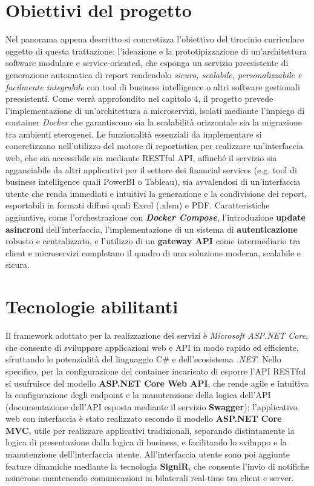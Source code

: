 \section{Obiettivi del progetto}
Nel panorama appena descritto si concretizza l'obiettivo del tirocinio curriculare oggetto di questa trattazione: l’ideazione e la prototipizzazione di un'architettura software modulare e service-oriented, che esponga un servizio preesistente di generazione automatica di report rendendolo \emph{sicuro, scalabile, personalizzabile e facilmente integrabile} con tool di business intelligence o altri software gestionali preesistenti.
Come verrà approfondito nel capitolo 4, il progetto prevede l'implementazione di un'architettura a microservizi, isolati mediante l'impiego di container \emph{Docker} che garantiscono sia la scalabilità orizzontale sia la migrazione tra ambienti eterogenei.
Le funzionalità essenziali da implementare si concretizzano nell'utilizzo del motore di reportistica per realizzare un'interfaccia web, che sia accessibile sia mediante RESTful API, affinché il servizio sia agganciabile da altri applicativi per il settore dei financial services (e.g. tool di business intelligence quali PowerBI o Tableau), sia avvalendosi di un'interfaccia utente che renda immediati e intuitivi la generazione e la condivisione dei report, esportabili in formati diffusi quali Excel (.xlsm) e PDF.
Caratteristiche aggiuntive, come l'orchestrazione con \emph{\textbf{Docker Compose}}, l'introduzione \textbf{update asincroni} dell'interfaccia, l'implementazione di un sistema di \textbf{autenticazione} robusto e centralizzato, e l'utilizzo di un \textbf{gateway API} come intermediario tra client e microservizi completano il quadro di una soluzione moderna, scalabile e sicura.

\section{Tecnologie abilitanti}
Il framework adottato per la realizzazione dei servizi è \emph{Microsoft ASP.NET Core}, che consente di sviluppare applicazioni web e API in modo rapido ed efficiente, sfruttando le potenzialità del linguaggio C\# e dell'ecosistema \emph{.NET}.
Nello specifico, per la configurazione del container incaricato di esporre l'API RESTful si usufruisce del modello \textbf{ASP.NET Core Web API}, che rende agile e intuitiva la configurazione degli endpoint e la manutenzione della logica dell'API (documentazione dell'API esposta mediante il servizio \textbf{Swagger}); l'applicativo web con interfaccia è stato realizzato secondo il modello \textbf{ASP.NET Core MVC}, utile per realizzare applicativi tradizionali\footnotemark, separando distintamente la logica di presentazione dalla logica di business, e facilitando lo sviluppo e la manutenzione dell'interfaccia utente. All'interfaccia utente sono poi aggiunte feature dinamiche mediante la tecnologia \textbf{SignlR}, che consente l'invio di notifiche asincrone mantenendo comunicazioni in bilaterali real-time tra client e server.

